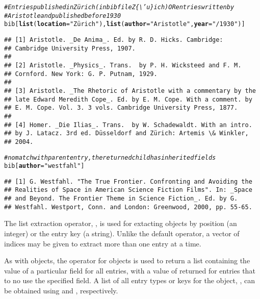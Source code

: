 \documentclass[article]{jss}\usepackage[]{graphicx}\usepackage[]{color}
\makeatletter
\newcommand{\hlstr}[1]{\textcolor[rgb]{0.125,0.125,1}{#1}}%
\newcommand{\hlcom}[1]{\textcolor[rgb]{1,0,0.753}{\textit{#1}}}%
\newcommand{\hlstd}[1]{\textcolor[rgb]{0.251,0.251,0.282}{#1}}%
\newcommand{\hlkwc}[1]{\textcolor[rgb]{0.529,0,0.184}{\textbf{#1}}}%
\newcommand{\hlkwd}[1]{\textcolor[rgb]{0.251,0.251,0.282}{\textbf{#1}}}%
\newenvironment{kframe}{%
 \def\at@end@of@kframe{}%
 \ifinner\ifhmode%
  \def\at@end@of@kframe{\end{minipage}}%
  \begin{minipage}{\columnwidth}%
 \fi\fi%
 \def\FrameCommand##1{\hskip\@totalleftmargin \hskip-\fboxsep
 \colorbox{shadecolor}{##1}\hskip-\fboxsep
     \hskip-\linewidth \hskip-\@totalleftmargin \hskip\columnwidth}%
 \MakeFramed {\advance\hsize-\width
   \@totalleftmargin\z@ \linewidth\hsize
   \@setminipage}}%
 {\par\unskip\endMakeFramed%
 \at@end@of@kframe}
\newenvironment{knitrout}{}{} %
\newcommand{\bt}{\`{}}
\makeatother
\begin{document}
\begin{knitrout}
\color{fgcolor}\begin{kframe}
\begin{alltt}
\hlcom{# Entries published in Zürich (in bib file Z\{\textbackslash{}'u\}ich) OR entries written by}
\hlcom{# Aristotle and published before 1930}
\hlstd{bib[}\hlkwd{list}\hlstd{(}\hlkwc{location} \hlstd{=} \hlstr{"Zürich"}\hlstd{),} \hlkwd{list}\hlstd{(}\hlkwc{author} \hlstd{=} \hlstr{"Aristotle"}\hlstd{,} \hlkwc{year} \hlstd{=} \hlstr{"/1930"}\hlstd{)]}
\end{alltt}
\begin{verbatim}
## [1] Aristotle. _De Anima_. Ed. by R. D. Hicks. Cambridge:
## Cambridge University Press, 1907.
## 
## [2] Aristotle. _Physics_. Trans.  by P. H. Wicksteed and F. M.
## Cornford. New York: G. P. Putnam, 1929.
## 
## [3] Aristotle. _The Rhetoric of Aristotle with a commentary by the
## late Edward Meredith Cope_. Ed. by E. M. Cope. With a comment. by
## E. M. Cope. Vol. 3. 3 vols. Cambridge University Press, 1877.
## 
## [4] Homer. _Die Ilias_. Trans.  by W. Schadewaldt. With an intro.
## by J. Latacz. 3rd ed. Düsseldorf and Zürich: Artemis \& Winkler,
## 2004.
\end{verbatim}
\begin{alltt}
\hlcom{# no match with parent entry, the returned child has inherited fields}
\hlstd{bib[}\hlkwc{author} \hlstd{=} \hlstr{"westfahl"}\hlstd{]}
\end{alltt}
\begin{verbatim}
## [1] G. Westfahl. "The True Frontier. Confronting and Avoiding the
## Realities of Space in American Science Fiction Films". In: _Space
## and Beyond. The Frontier Theme in Science Fiction_. Ed. by G.
## Westfahl. Westport, Conn. and London: Greenwood, 2000, pp. 55-65.
\end{verbatim}
\end{kframe}
\end{knitrout}

The list extraction operator, \code{\bt[[\bt}, is used for extacting  objects by position (an integer) or the entry key (a string).  Unlike the default operator, a vector of indices may be given to extract more than one entry at a time.

As with  objects, the \code{\bt$\bt} operator for  objects is used to return a list containing the value of a particular field for all entries, with a value of  returned for entries that to no use the specified field.  A list of all entry types or keys for the  object, , can be obtained using  and , respectively.
\end{document}

